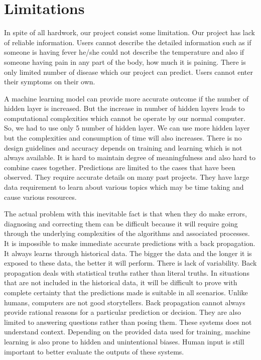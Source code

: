 {\section{Limitations}
In spite of all hardwork, our project consist some limitation. Our project has lack of reliable information. Users cannot describe the detailed information such as if someone is having fever he/she could not describe the temperature and also if someone having pain in any part of the body, how much it is paining. There is only limited number of disease which our project can predict. Users cannot enter their symptoms on their own.\par 
A machine learning model can provide more accurate outcome if the number of hidden layer is increased. But the increase in number of hidden layers leads to computational complexities which cannot be operate by our normal computer. So, we had to use only 5 number of hidden layer. We can use more hidden layer but the complexities and consumption of time will also increases. There is no design guidelines and accuracy depends on training and learning which is not always available. It is hard to maintain degree of meaningfulness and also hard to combine cases together. Predictions are limited to the cases that have been observed. They require accurate details on many past projects. They have large data requirement to learn about various topics which may be time taking and cause various resources.\par 
The actual problem with this inevitable fact is that when they do make errors, diagnosing and correcting them can be difficult because it will require going through the underlying complexities of the algorithms and associated processes. It is impossible to make immediate accurate predictions with a back propagation. It always learns through historical data. The bigger the data and the longer it is exposed to these data, the better it will perform. There is lack of variability. Back propagation deals with statistical truths rather than literal truths. In situations that are not included in the historical data, it will be difficult to prove with complete certainty that the predictions made is suitable in all scenarios. Unlike humans, computers are not good storytellers. Back propagation cannot always provide rational reasons for a particular prediction or decision. They are also limited to answering questions rather than posing them. These systems does not understand context. Depending on the provided data used for training, machine learning is also prone to hidden and unintentional biases. Human input is still important to better evaluate the outputs of these systems.

}
